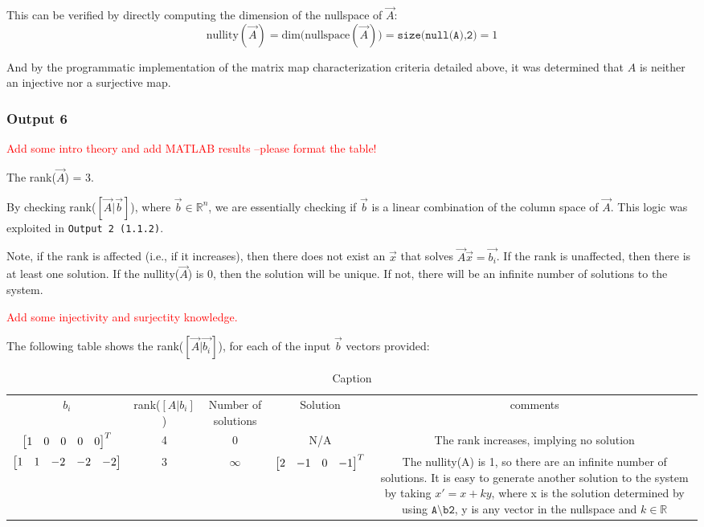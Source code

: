\documentclass[10pt]{article}
\begin{document}
This can be verified by directly computing the dimension of the nullspace of $\vec{A}$:
\begin{equation*}
    \text{nullity}(\vec{A}) = \text{dim(nullspace}(\vec{A})) = \texttt{size(null(A),2)} = 1
\end{equation*}

And by the programmatic implementation of the matrix map characterization criteria detailed above, it was determined that $A$ is neither an injective nor a surjective map.

\subsubsection{Output 6}
\textcolor{red}{Add some intro theory and add MATLAB results –please format the table!}

The rank($\vec{A}$) = 3. 

By checking rank($[\vec{A} | \vec{b}]$), where $\vec{b} \in \mathbb{R}^n$, we are essentially checking if $\vec{b}$ is a linear combination of the column space of $\vec{A}$. This logic was exploited in \texttt{Output 2 (1.1.2)}. 

Note, if the rank is affected (i.e., if it increases), then there does not exist an $\vec{x}$ that solves $\vec{A}\vec{x} = \vec{b_i}$. If the rank is unaffected, then there is at least one solution. If the nullity($\vec{A}$) is 0, then the solution will be unique. If not, there will be an infinite number of solutions to the system.  

\textcolor{red}{Add some injectivity and surjectity knowledge.}

The following table shows the rank($[\vec{A} | \vec{b_i}]$), for each of the input $\vec{b}$ vectors provided:

\begin{table}[h]
    \centering
    \begin{tabular}{c|c|c|c|c}
        $b_i$ & rank($[A|b_i]$) & Number of solutions & Solution & comments \\ 
        $\begin{bmatrix} 1&0&0&0&0 \end{bmatrix}^T$ & 4 & 0 & N/A & The rank increases, implying no solution\\
        $\begin{bmatrix} 1&1&-2&-2&-2 \end{bmatrix}$ & 3 & $\infty$ & $\begin{bmatrix} 2 & -1 & 0 & -1 \end{bmatrix}^T$ & The nullity(A) is 1, so there are an infinite number of solutions. It is easy to generate another solution to the system by taking $x' = x + ky$, where x is the solution determined by using $\texttt{A\textbackslash b2}$, y is any vector in the nullspace and $k \in \mathbb{R}$
    \end{tabular}
    \caption{Caption}
    \label{tab:my_label}
\end{table}
\end{document}
